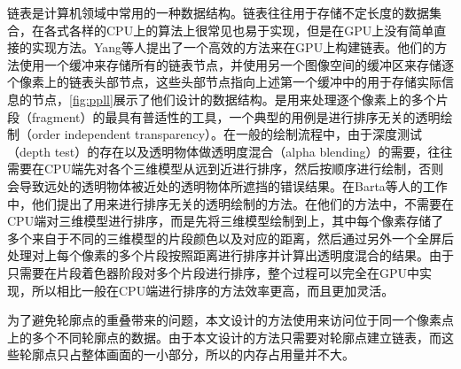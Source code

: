 链表是计算机领域中常用的一种数据结构。链表往往用于存储不定长度的数据集合，在各式各样的CPU上的算法上很常见也易于实现，但是在GPU上没有简单直接的实现方法。Yang等人提出了一个高效的方法\cite{yang2010real}来在GPU上构建链表。他们的方法使用一个缓冲来存储所有的链表节点，并使用另一个图像空间的缓冲区来存储逐个像素上的链表头部节点，这些头部节点指向上述第一个缓冲中的用于存储实际信息的节点，\autoref{fig:ppll}展示了他们设计的数据结构。\ppll{}是用来处理逐个像素上的多个片段（fragment）的最具有普适性的工具，一个典型的用例是进行排序无关的透明绘制（order independent transparency）。在一般的绘制流程中，由于深度测试（depth test）的存在以及透明物体做透明度混合（alpha blending）的需要，往往需要在CPU端先对各个三维模型从远到近进行排序，然后按顺序进行绘制，否则会导致远处的透明物体被近处的透明物体所遮挡的错误结果。在Barta等人的工作中\cite{barta2011order}，他们提出了用\ppll{}来进行排序无关的透明绘制的方法。在他们的方法中，不需要在CPU端对三维模型进行排序，而是先将三维模型绘制到\ppll{}上，其中每个像素存储了多个来自于不同的三维模型的片段颜色以及对应的距离，然后通过另外一个全屏后处理对\ppll{}上每个像素的多个片段按照距离进行排序并计算出透明度混合的结果。由于只需要在片段着色器阶段对多个片段进行排序，整个过程可以完全在GPU中实现，所以相比一般在CPU端进行排序的方法效率更高，而且更加灵活。

为了避免轮廓点的重叠带来的问题，本文设计的方法使用\ppll{}来访问位于同一个像素点上的多个不同轮廓点的数据。由于本文设计的方法只需要对轮廓点建立链表，而这些轮廓点只占整体画面的一小部分，所以\ppll{}的内存占用量并不大。